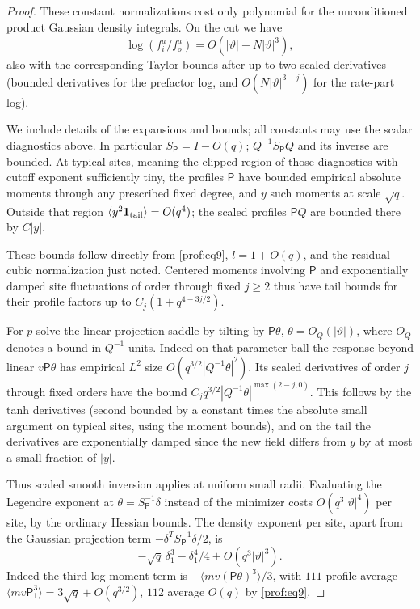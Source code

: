 \begin{proof}
These constant normalizations cost only polynomial for the unconditioned product Gaussian density integrals. On the cut we have
\begin{equation}\label{prof:eq14}
\log(f_i^a/f_o^a)=O(|\vartheta|+N |\vartheta|^3),
\end{equation}
also with the corresponding Taylor bounds after up to two scaled derivatives (bounded derivatives for the prefactor log, and \(O(N |\vartheta|^{3-j})\) for the rate-part log).

We include details of the expansions and bounds; all constants may use the scalar diagnostics above. In particular \(S_{\mathsf P}=I-O(q)\); \(Q^{-1}S_{\mathsf P} Q\) and its inverse are bounded. At typical sites, meaning the clipped region of those diagnostics with cutoff exponent sufficiently tiny, the profiles \(\mathsf P\) have bounded empirical absolute moments through any prescribed fixed degree, and \(y\) such moments at scale \(\sqrt q\). Outside that region \(\langle y^2{\bf1}_{\rm tail}\rangle=O(q^4)\); the scaled profiles \(\mathsf P Q\) are bounded there by \(C |y|\).

These bounds follow directly from \eqref{prof:eq9}, \(l=1+O(q)\), and the residual cubic normalization just noted. Centered moments involving \(\mathsf P\) and exponentially damped site fluctuations of order through fixed \(j\ge2\) thus have tail bounds for their profile factors up to \(C_j(1+q^{4-3j/2})\).

For \(p\) solve the linear-projection saddle by tilting by \(\mathsf P\theta\), \(\theta=O_Q(|\vartheta|)\), where \(O_Q\) denotes a bound in \(Q^{-1}\) units. Indeed on that parameter ball the response beyond linear \(v\mathsf P\theta\) has empirical \(L^2\) size \(O(q^{3/2}|Q^{-1}\theta|^2)\). Its scaled derivatives of order \(j\) through fixed orders have the bound \(C_j q^{3/2}|Q^{-1}\theta|^{\max(2-j,0)}\). This follows by the tanh derivatives (second bounded by a constant times the absolute small argument on typical sites, using the moment bounds), and on the tail the derivatives are exponentially damped since the new field differs from \(y\) by at most a small fraction of \(|y|\).

Thus scaled smooth inversion applies at uniform small radii. Evaluating the Legendre exponent at \(\theta=S_{\mathsf P}^{-1}\delta\) instead of the minimizer costs \(O(q^3 |\vartheta|^4)\) per site, by the ordinary Hessian bounds. The density exponent per site, apart from the Gaussian projection term \(-\delta^T S_{\mathsf P}^{-1}\delta/2\), is
\begin{equation}\label{prof:eq15}
-\sqrt q\,\delta_1^3-\delta_1^4/4+O(q^3|\vartheta|^3).
\end{equation}
Indeed the third log moment term is \(-\langle mv (\mathsf P\theta)^3\rangle/3\), with \(111\) profile average \(\langle mv \mathsf P_1^3\rangle=3\sqrt q+O(q^{3/2})\), \(112\) average \(O(q)\) by \eqref{prof:eq9}.


\end{proof}
